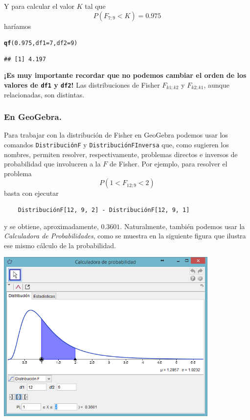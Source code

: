 \documentclass[10pt,a4paper]{article}\usepackage[]{graphicx}\usepackage[]{color}
\makeatletter
\newcommand{\hlnum}[1]{\textcolor[rgb]{0.686,0.059,0.569}{#1}}%
\newcommand{\hlstd}[1]{\textcolor[rgb]{0.345,0.345,0.345}{#1}}%
\newcommand{\hlkwc}[1]{\textcolor[rgb]{0.333,0.667,0.333}{#1}}%
\newcommand{\hlkwd}[1]{\textcolor[rgb]{0.737,0.353,0.396}{\textbf{#1}}}%
\newenvironment{kframe}{%
 \def\at@end@of@kframe{}%
 \ifinner\ifhmode%
  \def\at@end@of@kframe{\end{minipage}}%
  \begin{minipage}{\columnwidth}%
 \fi\fi%
 \def\FrameCommand##1{\hskip\@totalleftmargin \hskip-\fboxsep
 \colorbox{shadecolor}{##1}\hskip-\fboxsep
     \hskip-\linewidth \hskip-\@totalleftmargin \hskip\columnwidth}%
 \MakeFramed {\advance\hsize-\width
   \@totalleftmargin\z@ \linewidth\hsize
   \@setminipage}}%
 {\par\unskip\endMakeFramed%
 \at@end@of@kframe}
\newenvironment{knitrout}{}{} %
\makeatother
\begin{document}
Y para calcular el valor $K$ tal que
\[ P(F_{7;9} < K) = 0.975 \]
haríamos
\begin{knitrout}
\color{fgcolor}\begin{kframe}
\begin{alltt}
\hlkwd{qf}\hlstd{(}\hlnum{0.975}\hlstd{,} \hlkwc{df1}\hlstd{=}\hlnum{7}\hlstd{,} \hlkwc{df2}\hlstd{=}\hlnum{9}\hlstd{)}
\end{alltt}
\begin{verbatim}
## [1] 4.197
\end{verbatim}
\end{kframe}
\end{knitrout}

{\bf ¡Es muy importante recordar que no podemos cambiar el orden de los valores de {\tt df1} y {\tt df2}!} Las distribuciones de Fisher $F_{k1;k2}$ y $F_{k2;k1}$, aunque relacionadas, son distintas.

\subsubsection*{En GeoGebra.}
\label{tut09:subsec:FenGeoGebra}

Para trabajar con la distribución de Fisher en GeoGebra podemos usar los comandos {\tt DistribuciónF} y {\tt DistribuciónFInversa} que, como sugieren los nombres, permiten resolver, respectivamente, problemas directos e inversos de probabilidad que involucren a la $F$ de Fisher. Por ejemplo, para resolver el problema
\[P(1 < F_{12; 9} < 2)\]
basta con ejecutar
\begin{center}
  \begin{verbatim}
    DistribuciónF[12, 9, 2] - DistribuciónF[12, 9, 1]
  \end{verbatim}
\end{center}
y se obtiene, aproximadamente, $0.3601$. Naturalmente, también podemos usar la {\em Calculadora de Probabilidades}, como se muestra en la siguiente
figura que ilustra ese mismo cálculo de la probabilidad.

    \begin{center}
    \includegraphics[width=11cm]{../fig/Tut09-04.png}
    \end{center}
\end{document}
